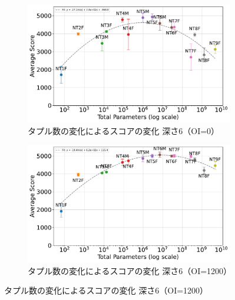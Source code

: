 \begin{figure}[t]
    \centering
    \begin{subfigure}[b]{\linewidth}
        \centering
        \includegraphics[width=\linewidth]{pdf/parameter_performance_plots/params_performance_OI0_EXP6.pdf}
        \caption{タプル数の変化によるスコアの変化 深さ6（OI=0）}
        \label{fig:score_vs_tuple_OI0_EXP6}
    \end{subfigure}

    \vspace{1em}
    \begin{subfigure}[b]{\linewidth}
        \centering
        \includegraphics[width=\linewidth]{pdf/parameter_performance_plots/params_performance_OI1200_EXP6.pdf}
        \caption{タプル数の変化によるスコアの変化 深さ6（OI=1200）}
        \label{fig:score_vs_tuple_OI1200_EXP6}
    \end{subfigure}


\end{figure}

